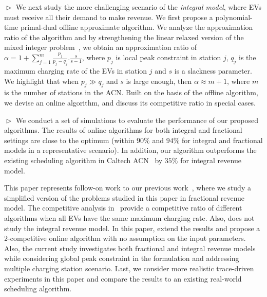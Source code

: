 \documentclass[journal]{IEEEtran}
\newcommand{\bt}[1]{{\color{blue}#1}}%
\newcommand{\rev}[1]{{\color{black}#1}}%
\newcommand{\bt}[1]{#1}
\newcommand{\rev}[1]{#1}
\begin{document}
$\vartriangleright$ We next study \rev{the} more challenging scenario of \rev{the} \textit{integral model}\rev{, }where EVs must receive all their demand to make revenue. We first propose a polynomial-time primal-dual offline approximate algorithm. We analyze the approximation ratio of the algorithm and by strengthening the linear relaxed version of the mixed integer problem~\cite{Carr}, we obtain an approximation ratio of $\alpha =1+\sum_{j=1}^m {\frac{p_j}{p_j-q_j}}.\frac{s}{s-1}$, where $p_j$ is local peak constraint in station $j$, $q_j$ is the maximum charging rate of the EVs in station $j$ and $s$ is a slackness parameter. We highlight that when $p_j \gg q_j$ and $s$ is \rev{large} enough, then $\alpha \approx m+1$, where $m$ is the number of stations in the ACN. Built on the basis of the offline algorithm, we devise an online algorithm, and discuss its competitive ratio in special cases. 

$\vartriangleright$ We conduct a set of  simulations to evaluate the performance of our proposed algorithms. 
The results of online algorithms for both integral and fractional settings are close to the optimum (within $90\%$ and $94\%$ for integral and fractional models in a representative scenario). In addition, our algorithm outperforms the existing scheduling algorithm in Caltech ACN~\cite{lee2016adaptive} by $35\%$ for integral revenue model.

\bt{This paper represents follow-on work to our previous work~\cite{alinia2018competitive}, where we study a simplified version of the problems studied in this paper in fractional revenue model. The competitive analysis in~\cite{alinia2018competitive} provide a competitive ratio of different algorithms when all EVs have the same maximum charging rate. Also, \cite{alinia2018competitive} does not study the integral revenue model. In this paper, extend the results and propose a 2-competitive online algorithm with no assumption on the input parameters. Also, the current study investigates both fractional and integral revenue models while considering global peak constraint in the formulation and addressing multiple charging station scenario. Last, we consider more realistic trace-driven experiments in this paper and compare the results to an existing real-world scheduling algorithm.}
\end{document}
